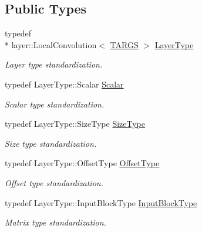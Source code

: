 \subsection*{Public Types}
\begin{DoxyCompactItemize}
\item 
typedef \\*
layer\-::\-Local\-Convolution$<$ \hyperlink{local__convolution_8hpp_a005b9b79411aa786124330e813a99057}{T\-A\-R\-G\-S} $>$ \hyperlink{classffnn_1_1optimizer_1_1_gradient_descent_3_01layer_1_1_local_convolution_3_01_t_a_r_g_s_01_4_01_4_a16ba9a242dbe61604f16ff2ae19a4d1f}{Layer\-Type}
\begin{DoxyCompactList}\small\item\em Layer type standardization. \end{DoxyCompactList}\item 
typedef Layer\-Type\-::\-Scalar \hyperlink{classffnn_1_1optimizer_1_1_gradient_descent_3_01layer_1_1_local_convolution_3_01_t_a_r_g_s_01_4_01_4_a151ba88e3b7b96dbe82897512745be47}{Scalar}
\begin{DoxyCompactList}\small\item\em Scalar type standardization. \end{DoxyCompactList}\item 
typedef Layer\-Type\-::\-Size\-Type \hyperlink{classffnn_1_1optimizer_1_1_gradient_descent_3_01layer_1_1_local_convolution_3_01_t_a_r_g_s_01_4_01_4_a710d6fff7052b3fc2f032ca74b0c3026}{Size\-Type}
\begin{DoxyCompactList}\small\item\em Size type standardization. \end{DoxyCompactList}\item 
typedef Layer\-Type\-::\-Offset\-Type \hyperlink{classffnn_1_1optimizer_1_1_gradient_descent_3_01layer_1_1_local_convolution_3_01_t_a_r_g_s_01_4_01_4_aef03166f60cff06f14ed5e36cf371a5e}{Offset\-Type}
\begin{DoxyCompactList}\small\item\em Offset type standardization. \end{DoxyCompactList}\item 
typedef Layer\-Type\-::\-Input\-Block\-Type \hyperlink{classffnn_1_1optimizer_1_1_gradient_descent_3_01layer_1_1_local_convolution_3_01_t_a_r_g_s_01_4_01_4_af401944b8f1e2b6ed6cea8b8211e25f7}{Input\-Block\-Type}
\begin{DoxyCompactList}\small\item\em Matrix type standardization. \end{DoxyCompactList}\item 

\end{DoxyCompactItemize}
